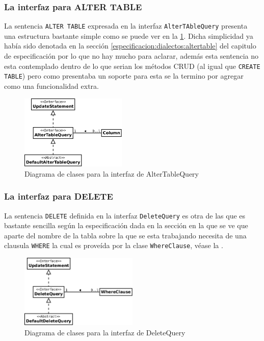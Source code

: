 \subsubsection{La interfaz para ALTER TABLE}
La sentencia \verb=ALTER TABLE= expresada en la interfaz \verb=AlterTAbleQuery= presenta una estructura bastante simple como se puede ver en la \ref{fig:dc-altertabletquery}. Dicha simplicidad ya había sido denotada en la sección \ref{especificacion:dialectos:altertable} del capitulo de especificación por lo que no hay mucho para aclarar, además esta sentencia no esta contemplado dentro de lo que serian los métodos CRUD (al igual que \verb=CREATE TABLE=) pero como \cc presentaba un soporte para esta se la termino por agregar como una funcionalidad extra.
\begin{figure}
  \centering
    \includegraphics[width=0.45\textwidth]{figuras/jdbgm-dc-altertable.png}
  \caption{Diagrama de clases para la interfaz de AlterTableQuery}
  \label{fig:dc-altertabletquery}
\end{figure}
%
\subsubsection{La interfaz para DELETE}
La sentencia \verb=DELETE= definida en la interfaz \verb=DeleteQuery= es otra de las que es bastante sencilla según la especificación dada en la sección  en la que se ve que aparte del nombre de la tabla sobre la que se esta trabajando necesita de una clausula \verb=WHERE= la cual es proveída por la clase \verb=WhereClause=, véase la .
%
\begin{figure}
  \centering
    \includegraphics[width=0.5\textwidth]{figuras/jdbgm-dc-delete.png}
  \caption{Diagrama de clases para la interfaz de DeleteQuery}
  \label{fig:dc-deletequery}
\end{figure}

